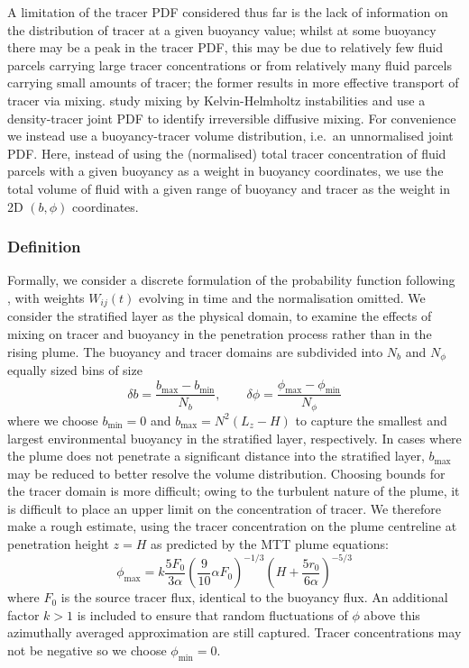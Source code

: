 \documentclass[a4paper]{article}
\begin{document}
A limitation of the tracer PDF considered thus far is the lack of information on the distribution of tracer at
a given buoyancy value; whilst at some buoyancy there may be a peak in the tracer PDF, this may be due to
relatively few fluid parcels carrying large tracer concentrations or from relatively many fluid parcels
carrying small amounts of tracer; the former results in more effective transport of tracer via mixing.
\citet{penney2020} study mixing by Kelvin-Helmholtz instabilities and use a density-tracer joint PDF to
identify irreversible diffusive mixing. For convenience we instead use a buoyancy-tracer volume distribution,
i.e.\ an unnormalised joint PDF. Here, instead of using the (normalised) total tracer concentration of fluid
parcels with a given buoyancy as a weight in buoyancy coordinates, we use the total volume of fluid with a
given range of buoyancy and tracer as the weight in 2D $(b, \phi)$ coordinates.

\subsubsection{Definition}
Formally, we consider a discrete formulation of the probability function following \citet{plumb2007}, with
weights $W_{ij}(t)$ evolving in time and the normalisation omitted. We consider the stratified layer as the
physical domain, to examine the effects of mixing on tracer and buoyancy in the penetration process rather
than in the rising plume. The buoyancy and tracer domains are subdivided into $N_b$ and $N_\phi$ equally sized
bins of size
\begin{equation}
	\delta b = \frac{b_{\max} - b_{\min}}{N_b}, \hspace{2em} \delta \phi = \frac{\phi_{\max} -
		\phi_{\min}}{N_\phi}
\end{equation}
where we choose $b_{\min} = 0$ and $b_{\max} = N^2 (L_z - H)$ to capture the smallest and largest
environmental buoyancy in the stratified layer, respectively. In cases where the plume does not penetrate a
significant distance into the stratified layer, $b_{\max}$ may be reduced to better resolve the volume
distribution.  Choosing bounds for the tracer domain is more difficult; owing to the turbulent nature of the
plume, it is difficult to place an upper limit on the concentration of tracer. We therefore make a rough
estimate, using the tracer concentration on the plume centreline at penetration height $z=H$ as predicted by
the MTT plume equations:
\begin{equation}
	\phi_{\max}  = k\frac{5F_0}{3\alpha} \left(\frac{9}{10}\alpha F_0\right)^{-1/3} \left(H +
		\frac{5r_0}{6\alpha}\right)^{-5/3}
\end{equation}
where $F_0$ is the source tracer flux, identical to the buoyancy flux. An additional factor $k > 1$ is
included to ensure that random fluctuations of $\phi$ above this azimuthally averaged approximation are still
captured. Tracer concentrations may not be negative so we choose $\phi_{\min} = 0$.
\end{document}

